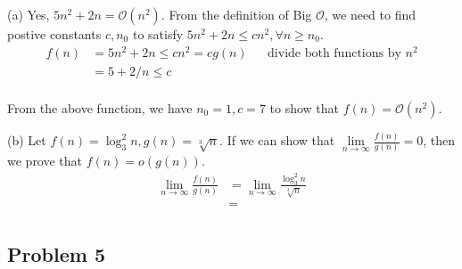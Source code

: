 \documentclass[a4paper]{article}
\makeatletter
\newenvironment{solution}
  {\begin{proof}[Solution]}
  {\end{proof}}
\renewenvironment{proof}[1][\proofname]{%
  \par\pushQED{\qed}\normalfont%
  \topsep6\p@\@plus6\p@\relax
  \trivlist\item[\hskip\labelsep\bfseries#1\@addpunct{.}]%
  \ignorespaces
}{%
  \popQED\endtrivlist\@endpefalse
}
\makeatother
\begin{document}
\begin{solution}
  (a) Yes, $5n^2 + 2n = \mathcal{O}(n^2)$. From the definition of Big $\mathcal{O}$, we need to find postive constants $c, n_0$ to satisfy $5n^2 + 2n \le cn^2, \forall n \ge n_0$.
  \begin{align*}
    f(n) &= 5n^2 + 2n \le cn^ 2 = cg(n) && \text{divide both functions by $n^2$}\\
        &= 5 + 2/n \le c \\
  \end{align*}

  From the above function, we have $n_0 = 1, c = 7$ to show that $f(n) = \mathcal{O}(n^2)$.
\end{solution}

\begin{solution}
  (b) Let $f(n) = \log_3^2 n, g(n) = \sqrt[3]{n}$. If we can show that $\lim\limits_{n \to \infty}\frac{f(n)}{g(n)} = 0$, then we prove that $f(n) = o(g(n))$.
  \begin{align*}
    \lim\limits_{n \to \infty}\frac{f(n)}{g(n)} &= \lim\limits_{n \to \infty}\frac{\log_3^2 n}{\sqrt[3]n} \\
                                                &=  \\
  \end{align*}
\end{solution}

\subsection*{Problem 5}
\end{document}
